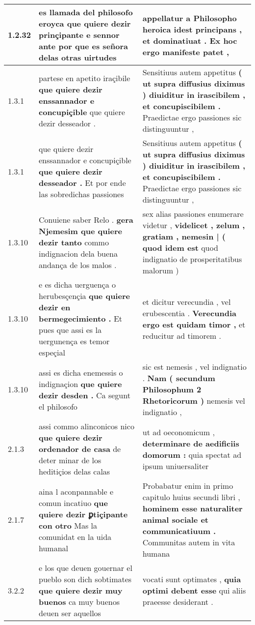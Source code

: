 \begin{tabular}{|p{1cm}|p{6.5cm}|p{6.5cm}|}
1.2.32 & es llamada del philosofo eroyca \textbf{ que quiere dezir prinçipante e sennor ante } por que es señora delas otras uirtudes & appellatur a Philosopho heroica \textbf{ idest principans , et dominatiuat . } Ex hoc ergo manifeste patet , \\\hline
1.3.1 & partese en apetito iraçibile \textbf{ que quiere dezir enssannador e concupiçible } que quiere dezir desseador . & Sensitiuus autem appetitus \textbf{ ( ut supra diffusius diximus ) diuiditur in irascibilem , et concupiscibilem . } Praedictae ergo passiones sic distinguuntur , \\\hline
1.3.1 & que quiere dezir enssannador e concupiçible \textbf{ que quiere dezir desseador . } Et por ende las sobredichas passiones & Sensitiuus autem appetitus \textbf{ ( ut supra diffusius diximus ) diuiditur in irascibilem , et concupiscibilem . } Praedictae ergo passiones sic distinguuntur , \\\hline
1.3.10 & Conuiene saber Relo . \textbf{ gera Njemesim que quiere dezir tanto } commo indignacion dela buena andança de los malos . & sex alias passiones enumerare videtur , \textbf{ videlicet , zelum , gratiam , nemesin | ( quod idem est } quod indignatio de prosperitatibus malorum ) \\\hline
1.3.10 & e es dicha uerguença o herubesçençia \textbf{ que quiere dezir en bermegecimiento . } Et pues que assi es la uergunença es temor espeçial & et dicitur verecundia , vel erubescentia . \textbf{ Verecundia ergo est quidam timor , } et reducitur ad timorem . \\\hline
1.3.10 & assi es dicha enemessis o indignaçion \textbf{ que quiere dezir desden . } Ca segunt el philosofo & sic est nemesis , vel indignatio . \textbf{ Nam ( secundum Philosophum 2 Rhetoricorum ) } nemesis vel indignatio , \\\hline
2.1.3 & assi commo alinconicos nico \textbf{ que quiere dezir ordenador de casa } de deter minar de los heditiçios delas calas & ut ad oeconomicum , \textbf{ determinare de aedificiis domorum : } quia spectat ad ipsum uniuersaliter \\\hline
2.1.7 & aina l aconpannable e comun incatiuo \textbf{ que quiere dezir ꝑtiçipante con otro } Mas la comunidat en la uida humanal & Probabatur enim in primo capitulo huius secundi libri , \textbf{ hominem esse naturaliter animal sociale et communicatiuum . } Communitas autem in vita humana \\\hline
3.2.2 & e los que deuen gouernar el pueblo son dich sobtimates \textbf{ que quiere dezir muy buenos } ca muy buenos deuen ser aquellos & vocati sunt optimates , \textbf{ quia optimi debent esse } qui aliis praeesse desiderant . \\\hline

\end{tabular}
